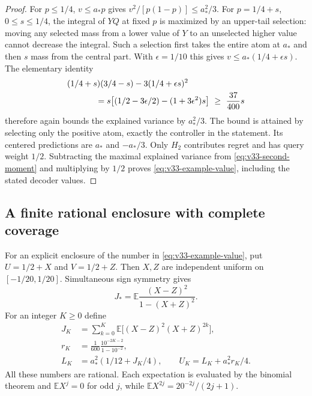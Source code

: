 \begin{proof}
For $p\le1/4$, $v\le a_*p$ gives
$v^2/[p(1-p)]\le a_*^2/3$. For $p=1/4+s$, $0\le s\le1/4$,
the integral of $YQ$ at fixed $p$ is maximized by an upper-tail
selection: moving any selected mass from a lower value of $Y$ to
an unselected higher value cannot decrease the integral. Such a
selection first takes the entire atom at $a_*$ and then $s$ mass
from the central part. With $\epsilon=1/10$ this gives
$v\le a_*(1/4+\epsilon s)$. The elementary identity
\[
 \begin{split}
 &(1/4+s)(3/4-s)-3(1/4+\epsilon s)^2\\
 &\hspace{12mm}=s\bigl[(1/2-3\epsilon/2)-(1+3\epsilon^2)s\bigr]
          \ \ge\ \frac{37}{400}s
 \end{split}
\]
therefore again bounds the explained variance by $a_*^2/3$.
The bound is attained by selecting only the positive atom, exactly
the controller in the statement. Its centered predictions are
$a_*$ and $-a_*/3$. Only $H_2$ contributes regret and has query
weight $1/2$. Subtracting the maximal explained variance from
\eqref{eq:v33-second-moment} and multiplying by $1/2$ proves
\eqref{eq:v33-example-value}, including the stated decoder values.
\end{proof}

\subsection{A finite rational enclosure with complete coverage}
For an explicit enclosure of the number in
\eqref{eq:v33-example-value}, put $U=1/2+X$ and $V=1/2+Z$.
Then $X,Z$ are independent uniform on $[-1/20,1/20]$. Simultaneous
sign symmetry gives
\[
 J_* =\mathbb E\frac{(X-Z)^2}{1-(X+Z)^2}.
\]
For an integer $K\ge0$ define
\begin{equation}\label{eq:v33-rational-enclosure}
 \begin{split}
 J_K&=\sum_{k=0}^K\mathbb E\bigl[(X-Z)^2(X+Z)^{2k}\bigr],\\
 r_K&=\frac1{600}\frac{10^{-2K-2}}{1-10^{-2}},\\
 L_K&=a_*^2(1/12+J_K/4),\qquad
 U_K=L_K+a_*^2r_K/4.
 \end{split}
\end{equation}
All these numbers are rational. Each expectation is evaluated by the
binomial theorem and
$\mathbb EX^j=0$ for odd $j$, while
$\mathbb EX^{2j}=20^{-2j}/(2j+1)$.


